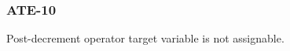 \subsubsection{ATE-10}\label{sec:error_code_ate_10}

Post-decrement operator target variable is not assignable.


